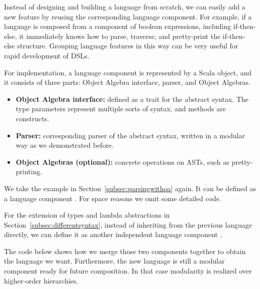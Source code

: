 Instead of designing and building a language from scratch, we can
easily add a new feature by reusing the corresponding language
component. For example, if a language is composed from a component of
boolean expressions, including if-then-else, it immediately knows how
to parse, traverse, and pretty-print the if-then-else structure.
Grouping language features in this way can
be very useful for rapid development of DSLs.

For implementation, a language component is represented by a Scala object, and it consists of three parts: Object Algebra interface, parser, and Object Algebras.

\begin{itemize}[leftmargin=*]
    \item \textbf{Object Algebra interface:} defined as a trait for the abstract syntax. The type parameters represent multiple sorts of syntax, and  methods are constructs.
    \item \textbf{Parser:} corresponding parser of the abstract syntax, written in a modular way as we demonstrated before.
    \item \textbf{Object Algebras (optional):} concrete operations on ASTs, such as pretty-printing.
\end{itemize}

We take the example in Section~\ref{subsec:parsingwithoa} again. It can be defined as a language component .
For space reasons we omit some detailed code.


For the extension of types and lambda abstractions in Section~\ref{subsec:differentsyntax}, instead of inheriting from the previous language directly, we can define it as another independent language component .


The code below shows how we merge those two components together to obtain the language we want. Furthermore, the new language is still a modular
component ready for future composition. In that case modularity is realized over higher-order hierarchies.


